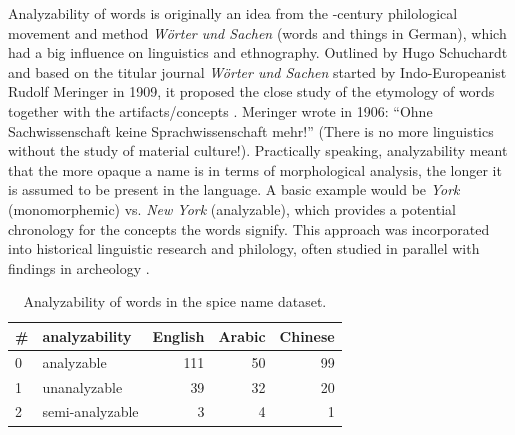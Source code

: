 Analyzability of words is originally an idea from the -century philological movement and method \textit{Wörter und Sachen} (words and things in German), which had a big influence on linguistics and ethnography. Outlined by Hugo Schuchardt and based on the titular journal \textit{Wörter und Sachen} started by Indo-Europeanist Rudolf Meringer in 1909, it proposed the close study of the etymology of words together with the artifacts/concepts \autocite{ortutay_magyar_1977}. Meringer wrote in 1906: ``Ohne Sachwissenschaft keine Sprachwissenschaft mehr!'' (There is no more linguistics without the study of material culture!). Practically speaking, analyzability meant that the more opaque a name is in terms of morphological analysis, the longer it is assumed to be present in the language. A basic example would be \textit{York} (monomorphemic) vs. \textit{New York} (analyzable), which provides a potential chronology for the concepts the words signify. This approach was incorporated into historical linguistic research and philology, often studied in parallel with findings in archeology \autocite{ortutay_magyar_1977}.

\begin{table}
  \centering
  \begin{tabular}{@{}llrrr@{}}
  \toprule
  \textbf{\#} & \textbf{analyzability} & \textbf{English} & \textbf{Arabic} & \textbf{Chinese} \\ \midrule
  0           & analyzable             & 111              & 50              & 99              \\
  1           & unanalyzable           & 39               & 32              & 20               \\
  2           & semi-analyzable        & 3                & 4               & 1                \\ \bottomrule
  \end{tabular}
  \caption{Analyzability of words in the spice name dataset.}
  \label{table:analyzability}
  \end{table}

